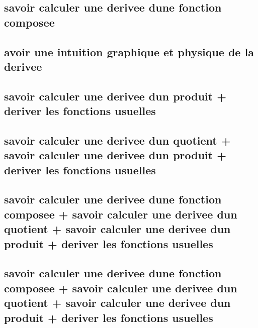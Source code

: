 \documentclass[11pt]{article}
\begin{document}
    \subsection{savoir calculer une derivee dune fonction composee}
      
      
    \subsection{avoir une intuition graphique et physique de la derivee}
      
    \subsection{savoir calculer une derivee dun produit + deriver les fonctions usuelles}
      
      
    \subsection{savoir calculer une derivee dun quotient + savoir calculer une derivee dun produit + deriver les fonctions usuelles}
      
      
    \subsection{savoir calculer une derivee dune fonction composee + savoir calculer une derivee dun quotient + savoir calculer une derivee dun produit + deriver les fonctions usuelles}
      
      
    \subsection{savoir calculer une derivee dune fonction composee + savoir calculer une derivee dun quotient + savoir calculer une derivee dun produit + deriver les fonctions usuelles}
      
      
\end{document}
